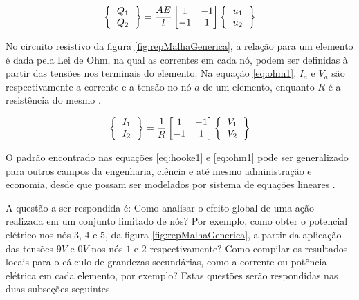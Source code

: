 \documentclass[
    12pt,               %
    openright,          %
    oneside,
    a4paper,            %
    english,            %
    french,             %
    spanish,            %
    brazil              %
    ]{abntex2}
\begin{document}
\begin{apendicesenv}
\begin{equation}
\label{eq:hooke1}
\left \{
\begin{tabular}{c}
$Q_1$ \\
$Q_2$
\end{tabular}       
\right \} =
\frac{AE}{l}
\begin{bmatrix}
1 & -1 \\
-1 & 1
\end{bmatrix}      
\left \{
\begin{tabular}{c}
$u_1$ \\
$u_2$
\end{tabular}       
\right \}            
\end{equation}


No circuito resistivo da figura \ref{fig:repMalhaGenerica}, a relação para um elemento é dada pela Lei de Ohm, na qual as correntes em cada nó, podem ser definidas à partir das tensões nos terminais do elemento. Na equação \ref{eq:ohm1}, $I_a$ e $V_a$ são respectivamente a corrente e a tensão no nó $a$ de um elemento, enquanto $R$ é a resistência do mesmo \cite[p. 7]{zien}.

\begin{equation}
\label{eq:ohm1}
\left \{
\begin{tabular}{c}
$I_1$ \\
$I_2$
\end{tabular}       
\right \} =
\frac{1}{R}
\begin{bmatrix}
1 & -1 \\
-1 & 1
\end{bmatrix}      
\left \{
\begin{tabular}{c}
$V_1$ \\
$V_2$
\end{tabular}       
\right \}            
\end{equation}

O padrão encontrado nas equações \ref{eq:hooke1} e \ref{eq:ohm1} pode ser generalizado para outros campos da engenharia, ciência e até mesmo administração e economia, desde que possam ser modelados por sistema de equações lineares \cite[p. 331]{burdenFaires}.

A questão a ser respondida é: Como analisar o efeito global de uma ação realizada em um conjunto limitado de nós? Por exemplo, como obter o potencial elétrico nos nós $3$, $4$ e $5$, da figura \ref{fig:repMalhaGenerica}, a partir da aplicação das tensões $9V$ e $0V$ nos nós $1$ e $2$ respectivamente? Como compilar os resultados locais  para o cálculo de grandezas secundárias, como a corrente ou potência elétrica em cada elemento, por exemplo? Estas questões serão respondidas nas duas subseções seguintes.



\end{apendicesenv}
\end{document}
